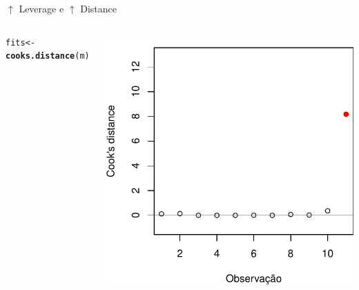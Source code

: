 \documentclass{beamer}\usepackage[]{graphicx}\usepackage[]{color}
\makeatletter
\newcommand{\hlstd}[1]{\textcolor[rgb]{0.345,0.345,0.345}{#1}}%
\newcommand{\hlkwb}[1]{\textcolor[rgb]{0.69,0.353,0.396}{#1}}%
\newcommand{\hlkwd}[1]{\textcolor[rgb]{0.737,0.353,0.396}{\textbf{#1}}}%
\newenvironment{kframe}{%
 \def\at@end@of@kframe{}%
 \ifinner\ifhmode%
  \def\at@end@of@kframe{\end{minipage}}%
  \begin{minipage}{\columnwidth}%
 \fi\fi%
 \def\FrameCommand##1{\hskip\@totalleftmargin \hskip-\fboxsep
 \colorbox{shadecolor}{##1}\hskip-\fboxsep
     \hskip-\linewidth \hskip-\@totalleftmargin \hskip\columnwidth}%
 \MakeFramed {\advance\hsize-\width
   \@totalleftmargin\z@ \linewidth\hsize
   \@setminipage}}%
 {\par\unskip\endMakeFramed%
 \at@end@of@kframe}
\newenvironment{knitrout}{}{} %
\renewenvironment{knitrout}{\setlength{\topsep}{0mm}}{}
\makeatother
\begin{document}
\begin{frame}{$\uparrow$ Leverage e $\uparrow$ Distance}
\begin{columns}[c]
\begin{knitrout}\tiny
{}\color{fgcolor}\begin{kframe}
\begin{alltt}
\hlstd{fits} \hlkwb{<-} \hlkwd{cooks.distance}\hlstd{(m)}
\end{alltt}
\end{kframe}
\includegraphics[width=1\linewidth]{figure/inf4-1} 

\end{knitrout}

\end{columns}
\end{frame}
\end{document}
